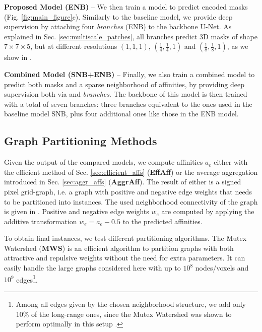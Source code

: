 \textbf{Proposed Model (ENB)} -- We then train a model to predict encoded \maskname masks (Fig. \ref{fig:main_figure}c). Similarly to the baseline model, we provide deep supervision by attaching four \emph{\encBr branches} (ENB) to the backbone U-Net. As explained in Sec. \ref{sec:multiscale_patches}, all branches predict 3D masks of shape $7 \times 7 \times 5$, but at different resolutions $(1,1,1)$, $(\frac{1}{4},\frac{1}{4},1)$ and $(\frac{1}{8},\frac{1}{8},1)$, as we show in .

\textbf{Combined Model (SNB+ENB)} -- Finally, we also train a combined model to predict both \maskname masks and a sparse neighborhood of affinities, by providing deep supervision both via \emph{\encBr} and \emph{\sparseBr} \emph{branches}. The backbone of this model is then trained with a total of seven branches: three branches equivalent to the ones used in the baseline model SNB, plus four additional ones like those in the ENB model.  

\subsection{Graph Partitioning Methods} 
Given the output of the compared models, we compute affinities $a_e$ either with the efficient method of Sec. \ref{sec:efficient_affs} (\textbf{EffAff}) or the average aggregation introduced in Sec. \ref{sec:aggr_affs} (\textbf{AggrAff}). 
The result of either is a signed pixel grid-graph, i.e. a graph with positive and negative edge weights that needs to be partitioned into instances. 
The used neighborhood connectivity of the graph is given in . Positive and negative edge weights $w_e$ are computed by applying the additive transformation $w_e=a_e-0.5$ to the predicted affinities.


To obtain final instances, we test different partitioning algorithms.
The Mutex Watershed (\textbf{MWS}) \cite{wolf2018mutex} is an efficient algorithm to partition graphs with both attractive and repulsive weights without the need for extra parameters. It can easily handle the large graphs considered here with up to $10^8$ nodes/voxels and $10^9$ edges\footnote{Among all edges given by the chosen neighborhood structure, we add only 10\% of the long-range ones, since the Mutex Watershed was shown to perform optimally in this setup \cite{bailoni2019generalized,wolf2018mutex}.}. 

